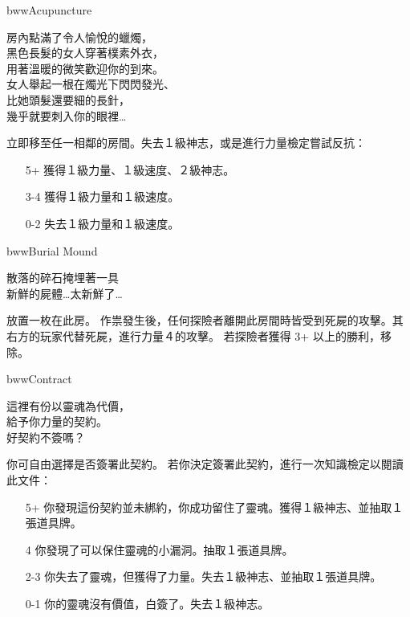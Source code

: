 %
\begin{EventCard}{bww}{Acupuncture}
  \begin{CardStory}
    房內點滿了令人愉悅的蠟燭，\\
    黑色長髮的女人穿著樸素外衣，\\
    用著溫暖的微笑歡迎你的到來。\\
    女人舉起一根在燭光下閃閃發光、\\
    比她頭髮還要細的長針，\\
    幾乎就要刺入你的眼裡…
  \end{CardStory}
  立即移至任一相鄰的房間。失去１級神志，或是進行力量檢定嘗試反抗：
  \begin{itemize}
    \item[5+] 獲得１級力量、１級速度、２級神志。
    \item[3-4] 獲得１級力量和１級速度。
    \item[0-2] 失去１級力量和１級速度。
  \end{itemize}
\end{EventCard}%
\linebreak[0]%
\begin{EventCard}{bww}{Burial Mound}
  \begin{CardStory}
    散落的碎石掩埋著一具\\
    新鮮的屍體…太新鮮了…
  \end{CardStory}
  放置一枚在此房。\smallbreak
  作祟發生後，任何探險者離開此房間時皆受到死屍的攻擊。其右方的玩家代替死屍，進行力量４的攻擊。\smallbreak
  若探險者獲得 3+ 以上的勝利，移除。\smallbreak
\end{EventCard}%
\linebreak[0]%
\begin{EventCard}{bww}{Contract}
  \begin{CardStory}
    這裡有份以靈魂為代價，\\
    給予你力量的契約。\\
    好契約不簽嗎？
  \end{CardStory}
  你可自由選擇是否簽署此契約。\smallbreak
  若你決定簽署此契約，進行一次知識檢定以閱讀此文件：
  \begin{itemize}
    \item[5+] 你發現這份契約並未綁約，你成功留住了靈魂。獲得１級神志、並抽取１張道具牌。
    \item[4] 你發現了可以保住靈魂的小漏洞。抽取１張道具牌。
    \item[2-3] 你失去了靈魂，但獲得了力量。失去１級神志、並抽取１張道具牌。
    \item[0-1] 你的靈魂沒有價值，白簽了。失去１級神志。
  \end{itemize}
\end{EventCard}%
